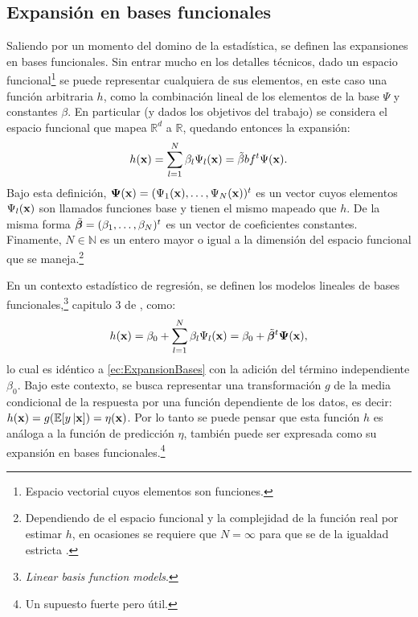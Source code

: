 \documentclass[../Main/Main.tex]{subfiles}
\begin{document}
\subsection{Expansión en bases funcionales}
Saliendo por un momento del domino de la estadística, se definen las expansiones en bases funcionales. Sin entrar mucho en los detalles técnicos, dado un espacio funcional\footnote{Espacio vectorial cuyos elementos son funciones.} se puede representar cualquiera de sus elementos, en este caso una función arbitraria $h$, como la combinación lineal de los elementos de la base $\Psi$  y constantes $\beta$. En particular (y dados los objetivos del trabajo) se considera el espacio funcional que mapea $\mathbb{R}^d$ a $\mathbb{R}$, quedando entonces la expansión: 
\begin{align} 
	h(\mathbf{x}) = \sum_{l = 1}^{N}\beta_l\Psi_l(\mathbf{x}) = \tilde{\beta}bf^t\Psi(\mathbf{x}). \label{ec:ExpansionBases}
\end{align}
Bajo esta definición, $\bm{\Psi}(\mathbf{x}) = (\Psi_1(\mathbf{x}),\ldots,\Psi_{N}(\mathbf{x}))^t$ es un vector cuyos elementos $\Psi_l(\mathbf{x})$ son llamados funciones base y tienen el mismo mapeado que $h$. De la misma forma $\tilde{\bm{\beta}} = (\beta_1,\ldots,\beta_{N})^t$ es un vector de coeficientes constantes. Finamente, $N\in\mathbb{N}$ es un entero mayor o igual a la dimensión del espacio funcional que se maneja.\footnote{Dependiendo de el espacio funcional y la complejidad de la función real por estimar $h$, en ocasiones se requiere que $N = \infty$ para que se de la igualdad estricta \autocite{bergstrom1985estimation}.}

En un contexto estadístico de regresión, se definen los modelos lineales de bases funcionales,\footnote{\textit{Linear basis function models}.} capitulo 3 de \citet{bishop2006pattern}, como:
\begin{align} 
	h(\mathbf{x}) = \beta_0 + \sum_{l = 1}^{N} \beta_l\Psi_l(\mathbf{x}) = \beta_0 + \tilde{\bm{\beta}}^t\bm{\Psi}(\mathbf{x}), \label{ec:LBFM}
\end{align}
lo cual es idéntico a \eqref{ec:ExpansionBases} con la adición del término independiente $\beta_0$. Bajo este contexto, se busca representar una transformación $g$ de la media condicional de la respuesta por una función dependiente de los datos, es decir: $h(\mathbf{x}) = g(\mathbb{E}[y\,|\mathbf{x}]) = \eta(\mathbf{x})$. Por lo tanto se puede pensar que esta función $h$ es análoga a la función de predicción $\eta$, también puede ser expresada como su expansión en bases funcionales.\footnote{Un supuesto fuerte pero útil.} 
\end{document}

